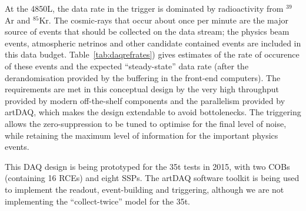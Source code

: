 At the 4850L, the data rate in the trigger is dominated by
radioactivity from $^{39}$Ar and $^{85}$Kr.  The cosmic-rays that
occur about once per minute are the major source of events that should
be collected on the data stream; the physics beam events, atmospheric
netrinos and other candidate contained events are included in this
data budget.  
Table~\ref{tab:daqrefrates}) gives estimates of the
rate of occurence of these events and the expected ``steady-state'' data rate
(after the derandomisation provided by the buffering in the front-end
computers).  The requirements are met in this conceptual design by
the very high throughput provided by modern off-the-shelf components 
and the parallelism provided by artDAQ, which
makes the design extendable to avoid bottolenecks.  The triggering
allows the zero-suppression to be tuned to optimise for the final
level of noise, while retaining the maximum level of information for
the important physics events.

This DAQ design is being prototyped for the 35t tests in 2015, with
two COBs (containing 16 RCEs) and eight SSPs.  The artDAQ software
toolkit is being used to implement the readout, event-building and
triggering, although we are not implementing the ``collect-twice''
model for the 35t.

%
